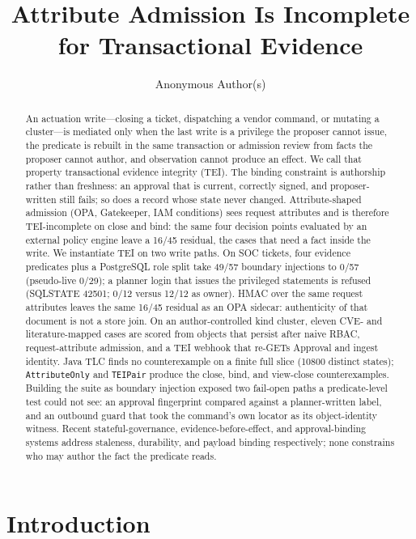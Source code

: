 \documentclass[acmsmall,manuscript,review,anonymous]{acmart}
\title[Attribute Admission Is Incomplete]{Attribute Admission Is Incomplete for Transactional Evidence}
\author{Anonymous Author(s)}
\affiliation{%
  \institution{Anonymous Institution}
  \country{}}
\renewcommand{\_}{\discretionary{\textunderscore}{}{\textunderscore}}
\begin{document}
\begin{abstract}
An actuation write---closing a ticket, dispatching a vendor command, or
mutating a cluster---is mediated only when the last write is a privilege the
proposer cannot issue, the predicate is rebuilt in the same transaction or
admission review from facts the proposer cannot author, and observation cannot
produce an effect. We call that property transactional evidence integrity
({TEI}). The binding constraint is authorship rather than freshness: an
approval that is current, correctly signed, and proposer-written still
fails; so does a record whose state never changed.
Attribute-shaped admission ({OPA}, Gatekeeper, {IAM} conditions)
sees request attributes and is therefore {TEI}-incomplete on close and
bind: the same four decision points evaluated by an external policy engine
leave a 16/45 residual, the cases that need a fact inside the write.
We instantiate {TEI} on two write paths. On {SOC} tickets, four evidence
predicates plus a {PostgreSQL} role split take 49/57 boundary injections
to 0/57 (pseudo-live 0/29); a planner login that issues the privileged
statements is refused ({SQLSTATE} 42501; 0/12 versus 12/12 as owner).
{HMAC} over the same request attributes leaves the same 16/45 residual as
an {OPA} sidecar: authenticity of that document is not a store join.
On an author-controlled kind cluster, eleven {CVE}- and
literature-mapped cases are scored from objects that persist after naive
{RBAC}, request-attribute admission, and a {TEI} webhook that re-{GET}s
Approval and ingest identity. Java {TLC} finds no counterexample on a
finite full slice (10800 distinct states);
\texttt{AttributeOnly} and \texttt{TEIPair} produce the close, bind, and
view-close counterexamples. Building the suite as boundary injection
exposed two fail-open paths a predicate-level test could not see: an
approval fingerprint compared against a planner-written label, and an
outbound guard that took the command's own locator as its object-identity
witness. Recent stateful-governance, evidence-before-effect, and
approval-binding systems address staleness, durability, and payload binding
respectively; none constrains who may author the fact the predicate reads.
\end{abstract}

\maketitle

\section{Introduction}
\label{sec:intro}
\end{document}
